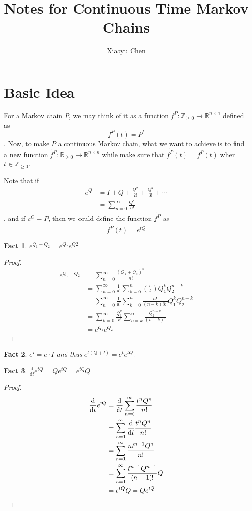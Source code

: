 \documentclass{article}
\title{Notes for Continuous Time Markov Chains}
\author{Xiaoyu Chen}
\date{}
\newtheorem{fact}{Fact}[section]
\begin{document}
\maketitle

\section{Basic Idea}
For a Markov chain $P$, we may think of it as a function $f^P: \mathbb{Z}_{\geq 0}\to \mathbb{R}^{n\times n}$ defined as
\[f^P(t) = P^t\].
Now, to make $P$ a continuous Markov chain, what we want to achieve is to find a new function $\tilde{f^P}: \mathbb{R}_{\geq 0} \to \mathbb{R}^{n\times n}$ while make sure that $\tilde{f^P}(t) = f^P(t)$ when $t\in \mathbb{Z}_{\geq 0}$.

Note that if
\begin{align*}
  e^Q &= I + Q + \frac{Q^2}{2!} + \frac{Q^3}{3!} + \cdots \\
      &= \sum_{n = 0}^\infty \frac{Q^n}{n!}
\end{align*},
and if $e^Q = P$, then we could define the function $\tilde{f^P}$ as
\[\tilde{f^P}(t) = e^{tQ}\]

\begin{fact}
  $e^{Q_1 + Q_2} = e^{Q1}e^{Q2}$
\end{fact}
\begin{proof}
  \begin{align*}
    e^{Q_1 + Q_2}
    &= \sum_{n=0}^\infty \frac{(Q_1 + Q_2)^n}{n!} \\
    &= \sum_{n=0}^\infty \frac{1}{n!} \sum_{k=0}^n \binom{n}{k} Q_1^k Q_2^{n-k} \\
    &= \sum_{n=0}^\infty \frac{1}{n!} \sum_{k=0}^n \frac{n!}{(n-k)!k!} Q_1^k Q_2^{n-k} \\
    &= \sum_{k=0}^\infty \frac{Q_1^k}{k!} \sum_{n=k}^\infty \frac{Q_2^{n-k}}{(n-k)!} \\
    &= e^{Q_1} e^{Q_2}
  \end{align*}
\end{proof}

\begin{fact}
  $e^I = e \cdot I$ and thus $e^{t(Q + I)} = e^t e^{tQ}$.
\end{fact}

\begin{fact}
  $\frac{\mathrm{d}}{\mathrm{d} t} e^{tQ} = Q e^{tQ} = e^{tQ} Q$
\end{fact}
\begin{proof}
  \begin{align*}
    \frac{\mathrm{d}}{\mathrm{d} t} e^{tQ}
    &= \frac{\mathrm{d}}{\mathrm{d} t} \sum_{n=0}^\infty \frac{t^nQ^n}{n!} \\
    &= \sum_{n=1}^\infty \frac{\mathrm{d}}{\mathrm{d} t}\frac{t^nQ^n}{n!} \\
    &= \sum_{n=1}^\infty \frac{n t^{n-1} Q^n}{n!} \\
    &= \sum_{n=1}^\infty \frac{t^{n-1} Q^{n-1}}{(n-1)!} Q \\
    &= e^{tQ} Q = Q e^{tQ} \qedhere
  \end{align*}
\end{proof}
\end{document}
